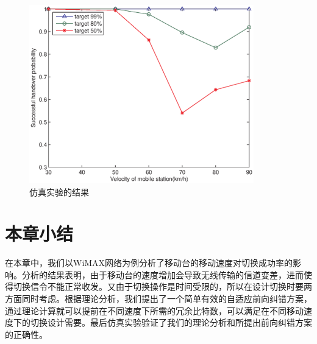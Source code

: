 \begin{figure}[t]
\begin{centering}
\includegraphics[height=7.75cm]{iccs_speed_prob_simu}
\caption{仿真实验的结果}
\label{fig:chap_iccs_results}
\end{centering}
\end{figure}

\section{本章小结}
在本章中，我们以WiMAX网络为例分析了移动台的移动速度对切换成功率的影响。分析的结果表明，由于移动台的速度增加会导致无线传输的信道变差，进而使得切换信令不能正常收发。又由于切换操作是时间受限的，所以在设计切换时要两方面同时考虑。根据理论分析，我们提出了一个简单有效的自适应前向纠错方案，通过理论计算就可以提前在不同速度下所需的冗余比特数，可以满足在不同移动速度下的切换设计需要。最后仿真实验验证了我们的理论分析和所提出前向纠错方案的正确性。
